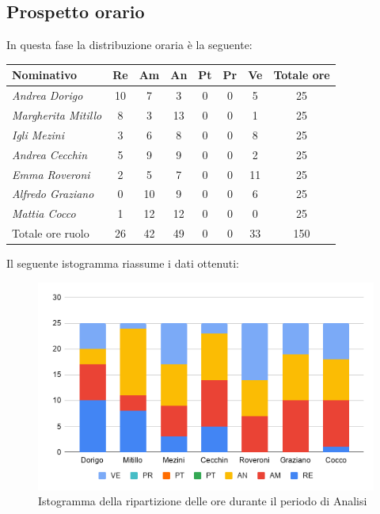 \subsection{Prospetto orario}\label{PreventivoFaseDiAnalisiProspettoOrario}
In questa fase la distribuzione oraria è la seguente:
\quad
\def\tabularxcolumn#1{m{#1}}
{

	\begin{center}
		\renewcommand{\arraystretch}{1.4}
		\begin{tabularx}{\textwidth}{|X|c|c|c|c|c|c|c|}
			\hline
			\rowcolor{airforceblue}
			\textbf{Nominativo} & \textbf{Re} & \textbf{Am} & \textbf{An} & \textbf{Pt} & \textbf{Pr} & \textbf{Ve} & \textbf{Totale ore}\\
			\hline
			\textit{Andrea Dorigo} & 10 & 7 & 3 & 0 & 0 & 5 & 25\\
			\hline
			\textit{Margherita Mitillo} & 8 & 3 & 13 & 0 & 0 & 1 & 25\\
			\hline
			\textit{Igli Mezini} & 3 & 6 & 8 & 0 & 0 & 8 & 25\\
			\hline
			\textit{Andrea Cecchin} & 5 & 9 & 9 & 0 & 0 & 2 & 25\\
			\hline
			\textit{Emma Roveroni} & 2 & 5 & 7 & 0 & 0 & 11 & 25\\
			\hline
			\textit{Alfredo Graziano} & 0 & 10 & 9 & 0 & 0 & 6 & 25\\
			\hline
			\textit{Mattia Cocco} & 1 & 12 & 12 & 0 & 0 & 0 & 25\\
			\hline
			Totale ore ruolo & 26 & 42 & 49 & 0 & 0 & 33 & 150\\
			\hline
		\end{tabularx}
	\end{center}

Il seguente istogramma riassume i dati ottenuti:
\begin{figure}[!ht]
	\begin{center}
		\includegraphics[width=0.8\linewidth]{../immagini/pdp/istogramma_analisi.png}
		\caption{Istogramma della ripartizione delle ore durante il periodo di Analisi}
	\end{center}
\end{figure}

}
